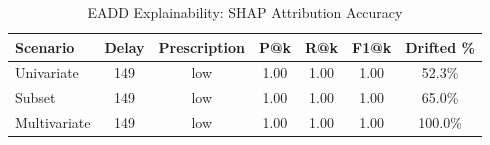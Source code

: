 \begin{table}[htbp]
\centering
\caption{EADD Explainability: SHAP Attribution Accuracy}
\label{tab:exp7_explainability}
\begin{tabular}{lcccccc}
\hline
Scenario & Delay & Prescription & P@k & R@k & F1@k & Drifted \% \\
\hline
Univariate & 149 & low & 1.00 & 1.00 & 1.00 & 52.3\% \\
Subset & 149 & low & 1.00 & 1.00 & 1.00 & 65.0\% \\
Multivariate & 149 & low & 1.00 & 1.00 & 1.00 & 100.0\% \\
\hline
\end{tabular}
\end{table}